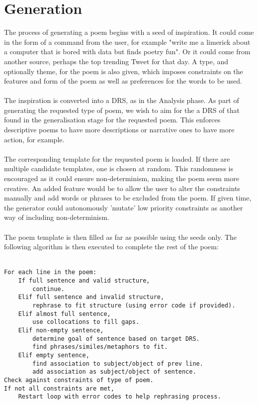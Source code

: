 \section{Generation}

The process of generating a poem begins with a seed of inspiration. It could come in the form of a command from the user, for example "write me a limerick about a computer that is bored with data but finds poetry fun". Or it could come from another source, perhaps the top trending Tweet for that day. A type, and optionally theme, for the poem is also given, which imposes constraints on the features and form of the poem as well as preferences for the words to be used.
\\\\
The inspiration is converted into a DRS, as in the Analysis phase. As part of generating the requested type of poem, we wish to aim for the a DRS of that found in the generalisation stage for the requested poem. This enforces descriptive poems to have more descriptions or narrative ones to have more action, for example.
\\\\
The corresponding template for the requested poem is loaded. If there are multiple candidate templates, one is chosen at random. This randomness is encouraged as it could ensure non-determinism, making the poem seem more creative. An added feature would be to allow the user to alter the constraints manually and add words or phrases to be excluded from the poem. If given time, the generator could autonomously 'mutate' low priority constraints as another way of including non-determinism.
\\\\
The poem template is then filled as far as possible using the seeds only. The following algorithm is then executed to complete the rest of the poem:
\\\\
\begin{lstlisting}
For each line in the poem:
	If full sentence and valid structure, 
		continue.
	Elif full sentence and invalid structure, 
		rephrase to fit structure (using error code if provided).
	Elif almost full sentence, 
		use collocations to fill gaps.
	Elif non-empty sentence,
		determine goal of sentence based on target DRS.
		find phrases/similes/metaphors to fit.
	Elif empty sentence,
		find association to subject/object of prev line.
		add association as subject/object of sentence.
Check against constraints of type of poem.
If not all constraints are met,
	Restart loop with error codes to help rephrasing process.
\end{lstlisting}		
